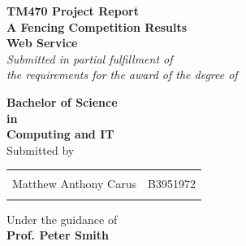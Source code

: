 \begin{titlepage}

\begin{center}

\textup{\small {\bf TM470 Project Report}}\\[0.2in]

\Large \textbf {A Fencing Competition Results \\ Web Service}\\[0.2in]

       \small \emph{Submitted in partial fulfillment of\\
        the requirements for the award of the degree of}
        \vspace{.2in}

       {\bf Bachelor of Science \\in\\ Computing and IT}\\[0.2in]

\normalsize Submitted by \\
\begin{table}[h]
\centering
\begin{tabular}{lr}\hline 
\\
Matthew Anthony Carus & B3951972 \\ \\ \hline 
\end{tabular}
\end{table}

\vspace{.1in}
Under the guidance of\\
{\textbf{Prof. Peter Smith}}\\[0.2in]

\vfill




\end{center}
\end{titlepage}
